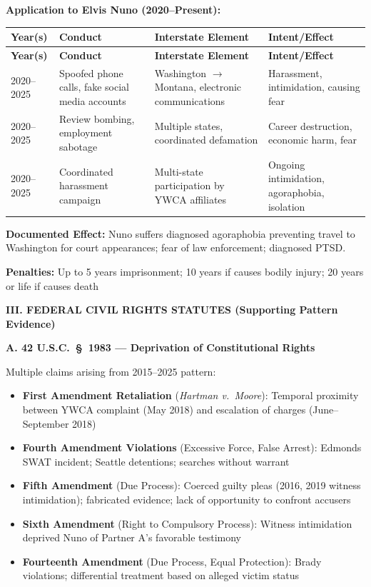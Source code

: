 \documentclass[11pt, letterpaper]{article}
\newcommand{\sectiontitle}[1]{\vspace{0.2in}\noindent\textcolor{NavyBlue}{\large\textbf{#1}}\vspace{0.1in}}
\newcommand{\subsectiontitle}[1]{\vspace{0.15in}\noindent\textcolor{NavyBlue}{\textbf{#1}}\vspace{0.05in}}
\begin{document}
\textbf{Application to Elvis Nuno (2020--Present):}

\begin{center}
\begin{longtable}{|p{0.8in}|p{1.6in}|p{1.5in}|p{1.6in}|}
\hline
\textbf{Year(s)} & \textbf{Conduct} & \textbf{Interstate Element} & \textbf{Intent/Effect} \\
\hline
\endfirsthead
\hline
\textbf{Year(s)} & \textbf{Conduct} & \textbf{Interstate Element} & \textbf{Intent/Effect} \\
\hline
\endhead
2020--2025 & Spoofed phone calls, fake social media accounts & Washington $\rightarrow$ Montana, electronic communications & Harassment, intimidation, causing fear \\
\hline
2020--2025 & Review bombing, employment sabotage & Multiple states, coordinated defamation & Career destruction, economic harm, fear \\
\hline
2020--2025 & Coordinated harassment campaign & Multi-state participation by YWCA affiliates & Ongoing intimidation, agoraphobia, isolation \\
\hline
\end{longtable}
\end{center}

\textbf{Documented Effect:} Nuno suffers diagnosed agoraphobia preventing travel to Washington for court appearances; fear of law enforcement; diagnosed PTSD.

\textbf{Penalties:} Up to 5 years imprisonment; 10 years if causes bodily injury; 20 years or life if causes death

\sectiontitle{III. FEDERAL CIVIL RIGHTS STATUTES (Supporting Pattern Evidence)}

\subsectiontitle{A. 42 U.S.C.\ \S\ 1983 --- Deprivation of Constitutional Rights}

Multiple claims arising from 2015--2025 pattern:
\begin{itemize}[leftmargin=*,itemsep=2pt]
    \item \textbf{First Amendment Retaliation} (\textit{Hartman v.\ Moore}): Temporal proximity between YWCA complaint (May 2018) and escalation of charges (June--September 2018)
    \item \textbf{Fourth Amendment Violations} (Excessive Force, False Arrest): Edmonds SWAT incident; Seattle detentions; searches without warrant
    \item \textbf{Fifth Amendment} (Due Process): Coerced guilty pleas (2016, 2019 witness intimidation); fabricated evidence; lack of opportunity to confront accusers
    \item \textbf{Sixth Amendment} (Right to Compulsory Process): Witness intimidation deprived Nuno of Partner A's favorable testimony
    \item \textbf{Fourteenth Amendment} (Due Process, Equal Protection): Brady violations; differential treatment based on alleged victim status
\end{itemize}
\end{document}
